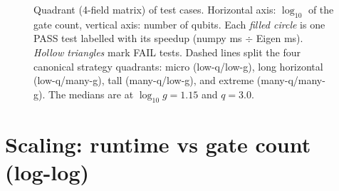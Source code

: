 \documentclass[11pt,a4paper]{article}
\begin{document}
\begin{figure}[h]
\caption{Quadrant (4-field matrix) of test cases. Horizontal axis:
$\log_{10}$ of the gate count, vertical axis: number of qubits. Each
\emph{filled circle} is one PASS test labelled with its speedup (numpy ms
$\div$ Eigen ms). \emph{Hollow triangles} mark FAIL tests. Dashed lines split
the four canonical strategy quadrants: micro (low-q/low-g), long horizontal
(low-q/many-g), tall (many-q/low-g), and extreme (many-q/many-g). The medians
are at $\log_{10} g = 1.15$ and $q = 3.0$.}
\end{figure}

\section{Scaling: runtime vs gate count (log-log)}
\end{document}
